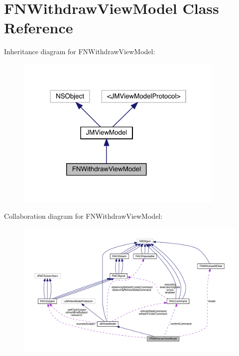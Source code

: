 \hypertarget{interface_f_n_withdraw_view_model}{}\section{F\+N\+Withdraw\+View\+Model Class Reference}
\label{interface_f_n_withdraw_view_model}


Inheritance diagram for F\+N\+Withdraw\+View\+Model\+:\nopagebreak
\begin{figure}[H]
\begin{center}
\leavevmode
\includegraphics[width=284pt]{interface_f_n_withdraw_view_model__inherit__graph}
\end{center}
\end{figure}


Collaboration diagram for F\+N\+Withdraw\+View\+Model\+:\nopagebreak
\begin{figure}[H]
\begin{center}
\leavevmode
\includegraphics[width=350pt]{interface_f_n_withdraw_view_model__coll__graph}
\end{center}
\end{figure}

